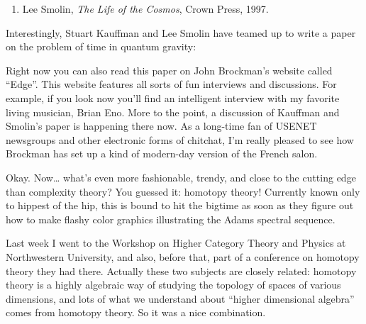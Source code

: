 \documentclass{article}
\def\tightlist{}
\renewcommand{\texttt}[1]{%
  \begingroup
  \ttfamily
  \begingroup\lccode`~=`/\lowercase{\endgroup\def~}{/\discretionary{}{}{}}%
  \begingroup\lccode`~=`[\lowercase{\endgroup\def~}{[\discretionary{}{}{}}%
  \begingroup\lccode`~=`.\lowercase{\endgroup\def~}{.\discretionary{}{}{}}%
  \catcode`/=\active\catcode`[=\active\catcode`.=\active
  \scantokens{#1\noexpand}%
  \endgroup
}
\begin{document}
\begin{enumerate}
\def\labelenumi{\arabic{enumi})}
\setcounter{enumi}{3}
\tightlist
\item
  Lee Smolin, \emph{The Life of the Cosmos}, Crown Press, 1997.
\end{enumerate}

Interestingly, Stuart Kauffman and Lee Smolin have teamed up to write a
paper on the problem of time in quantum gravity:


Right now you can also read this paper on John Brockman's website called
``Edge''. This website features all sorts of fun interviews and
discussions. For example, if you look now you'll find an intelligent
interview with my favorite living musician, Brian Eno. More to the
point, a discussion of Kauffman and Smolin's paper is happening there
now. As a long-time fan of USENET newsgroups and other electronic forms
of chitchat, I'm really pleased to see how Brockman has set up a kind of
modern-day version of the French salon.


Okay. Now\ldots{} what's even more fashionable, trendy, and close to the
cutting edge than complexity theory? You guessed it: homotopy theory!
Currently known only to hippest of the hip, this is bound to hit the
bigtime as soon as they figure out how to make flashy color graphics
illustrating the Adams spectral sequence.

Last week I went to the Workshop on Higher Category Theory and Physics
at Northwestern University, and also, before that, part of a conference
on homotopy theory they had there. Actually these two subjects are
closely related: homotopy theory is a highly algebraic way of studying
the topology of spaces of various dimensions, and lots of what we
understand about ``higher dimensional algebra'' comes from homotopy
theory. So it was a nice combination.
\end{document}

